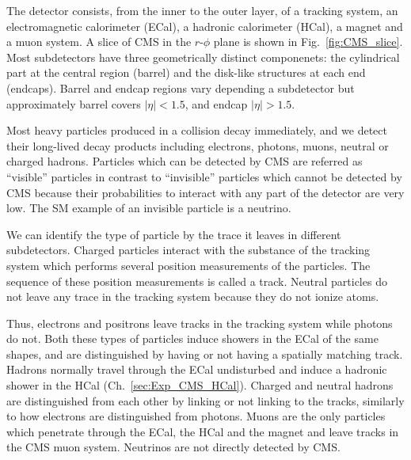 The detector consists, from the inner to the outer layer,  of a tracking system, an electromagnetic calorimeter (ECal), a hadronic calorimeter (HCal), a magnet and a muon system. A slice of CMS in the $r$-$\phi$ plane is shown in Fig.~\ref{fig:CMS_slice}. Most subdetectors have three geometrically distinct componenets: the cylindrical part at the central region (barrel) and the disk-like structures at each end (endcaps). Barrel and endcap regions vary depending a subdetector but approximately barrel covers $|\eta|<1.5$, and endcap $|\eta|>1.5$.

Most heavy particles produced in a collision decay immediately, and we detect their long-lived decay products including electrons, photons, muons, neutral or charged hadrons. Particles which can be detected by CMS are referred as ``visible'' particles in contrast to ``invisible'' particles which cannot be detected by CMS because their probabilities to interact with any part of the detector are very low. The SM example of an invisible particle is a neutrino.

We can identify the type of particle by the trace it leaves in different subdetectors. Charged particles interact with the substance of the tracking system which performs several position measurements of the particles. The sequence of these position measurements is called a track. Neutral particles do not leave any trace in the tracking system because they do not ionize atoms. 

Thus, electrons and positrons leave tracks in the tracking system while photons do not. Both these types of particles induce showers in the ECal of the same shapes, and are distinguished by having or not having a spatially matching track. Hadrons normally travel through the ECal undisturbed and induce a hadronic shower in the HCal (Ch.~\ref{sec:Exp_CMS_HCal}). Charged and neutral hadrons are distinguished from each other by linking or not linking to the tracks, similarly to how electrons are distinguished from photons. Muons are the only particles which penetrate through the ECal, the HCal and the magnet and leave tracks in the CMS muon system. Neutrinos are not directly detected by CMS.   

\clearpage

